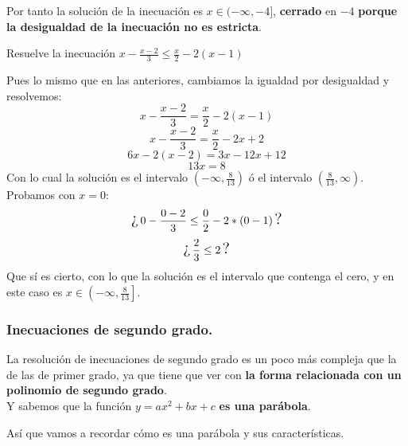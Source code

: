 \documentclass[a4paper,11pt,answers]{exam}
\newcommand{\testineq}[1]{\[\text{\Large{¿}}\,#1\,\text{\Large{?}}\]}
\begin{document}
\begin{questions}
\begin{solution}
    Por tanto la solución de la inecuación es $x\in (-\infty, -4]$, \textbf{cerrado} en $-4$
    \textbf{porque la desigualdad de la inecuación no es estricta}.
  \end{solution}
\question Resuelve la inecuación $x - \frac{x - 2}{3} \leq \frac{x}{2} - 2(x-1)$
  \begin{solution}
    Pues lo mismo que en las anteriores, cambiamos la igualdad por desigualdad y resolvemos:
    \[x - \frac{x - 2}{3} = \frac{x}{2} - 2(x-1)\]
    \[x - \frac{x - 2}{3} = \frac{x}{2} - 2x + 2\]
    \[6x - 2(x-2) = 3x -12x + 12\]
    \[13x = 8\]
    Con lo cual la solución es el intervalo $\left(-\infty, \frac{8}{13}\right)$ ó el intervalo
    $\left(\frac{8}{13},\infty\right)$.\\
    Probamos con $x=0$:
    \testineq{0 - \frac{0-2}{3} \leq \frac{0}{2} - 2*(0-1)}
    \testineq{\frac{2}{3} \leq 2}
    Que sí es cierto, con lo que la solución es el intervalo que contenga el cero, y en este caso
    es $x \in \left(-\infty, \frac{8}{13}\right]$.
  \end{solution}
\end{questions}
\subsubsection{Inecuaciones de segundo grado.}\label{inecuaciones_grado_2}
La resolución de inecuaciones de segundo grado es un poco más compleja que la de las de primer
grado, ya que tiene que ver con \textbf{la forma relacionada con un polinomio de
  segundo grado}.\\
Y sabemos que la función $y = ax^2 + bx + c$ \textbf{es una parábola}.

Así que vamos a recordar cómo es una parábola y sus características.
\end{document}
